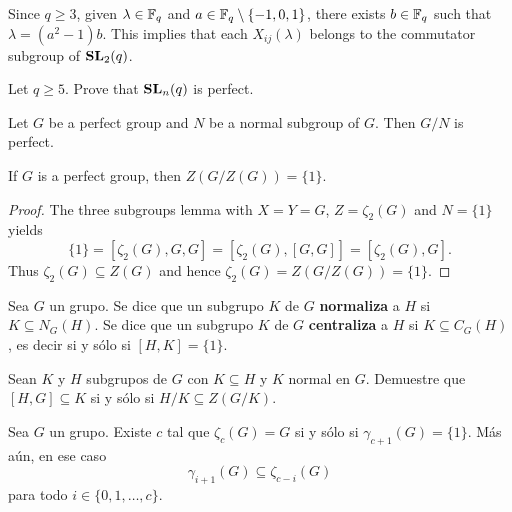Since $q\geq 3$, given $\lambda\in\mathbb{F}_q$ and $a\in\mathbb{F}_q\setminus\{-1,0,1\}$, there exists
$b\in\mathbb{F}_q$ such that $\lambda=(a^2-1)b$. This implies that each $X_{ij}(\lambda)$ belongs to the
commutator subgroup of $\mathbf{SL}_2(q)$. 


\begin{exercise}
Let $q\geq5$. 
Prove that $\mathbf{SL}_n(q)$ is perfect.  	
\end{exercise}


\begin{exercise}
Let $G$ be a perfect group and $N$ be a normal subgroup of $G$. Then $G/N$ is perfect.  	
\end{exercise}

\begin{theorem}[Gr\"un]
	\label{theorem:Grun}
	If $G$ is a perfect group, then $Z(G/Z(G))=\{1\}$. 
\end{theorem}

\begin{proof}
	The three subgroups lemma with $X=Y=G$, $Z=\zeta_2(G)$ and $N=\{1\}$ yields  
	\[
	\{1\}=[\zeta_2(G),G,G]=[\zeta_2(G),[G,G]]=[\zeta_2(G),G].
	\]
	Thus 	
	$\zeta_2(G)\subseteq Z(G)$ and hence 
	$\zeta_2(G)=Z(G/Z(G))=\{1\}$. 
\end{proof}

    Sea $G$ un grupo. Se dice que un subgrupo $K$ de $G$ \textbf{normaliza} a
	$H$ si $K\subseteq N_G(H)$.
	Se dice que un subgrupo $K$ de $G$ \textbf{centraliza} a
	$H$ si $K\subseteq C_G(H)$, es decir si y sólo si $[H,K]=\{1\}$.

\begin{exercise}
	Sean $K$ y $H$ subgrupos de $G$ con $K\subseteq H$ y $K$ normal en $G$.
	Demuestre que $[H,G]\subseteq K$ si y sólo si $H/K\subseteq Z(G/K)$. 
\end{exercise}
\begin{lemma}
	\label{lemma:gamma_zeta}
	Sea $G$ un grupo. Existe $c$ tal que $\zeta_c(G)=G$ si y sólo si 
	$\gamma_{c+1}(G)=\{1\}$. Más aún, en ese caso 
	\[
	\gamma_{i+1}(G)\subseteq\zeta_{c-i}(G)
	\]
	para todo $i\in\{0,1,\dots,c\}$. 
\end{lemma}

